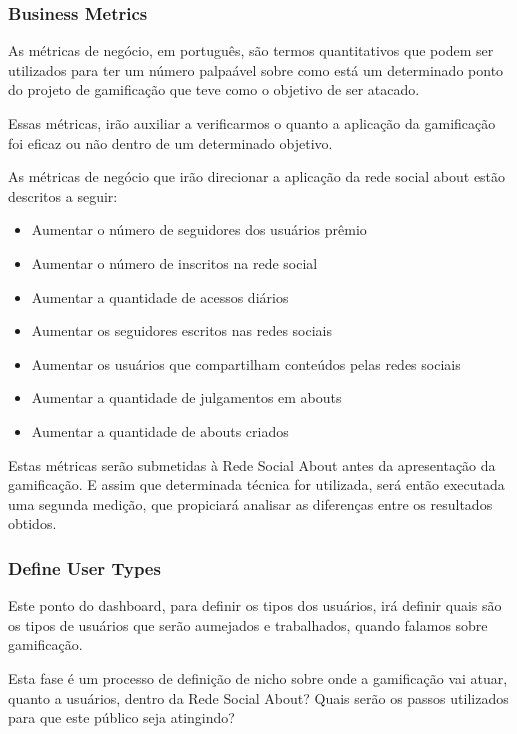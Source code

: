 \subsubsection{Business Metrics}
\label{sub:business_metrics}
As métricas de negócio, em português, são termos quantitativos que podem ser utilizados
para ter um número palpaável sobre como está um determinado ponto do projeto de gamificação
que teve como o objetivo de ser atacado.

Essas métricas, irão auxiliar a verificarmos o quanto a aplicação da gamificação foi 
eficaz ou não dentro de um determinado objetivo.

As métricas de negócio que irão direcionar a aplicação da rede social about estão
descritos a seguir:

\begin{itemize}
    \item Aumentar o número de seguidores dos usuários prêmio
    \item Aumentar o número de inscritos na rede social
    \item Aumentar a quantidade de acessos diários
    \item Aumentar os seguidores escritos nas redes sociais
    \item Aumentar os usuários que compartilham conteúdos pelas redes sociais
    \item Aumentar a quantidade de julgamentos em abouts
    \item Aumentar a quantidade de abouts criados
\end{itemize}

Estas métricas serão submetidas à Rede Social About antes da apresentação da
gamificação. E assim que determinada técnica for utilizada, será então executada uma
segunda medição, que propiciará analisar as diferenças entre os resultados obtidos.

\subsubsection{Define User Types}
\label{sub:define_user_types}
Este ponto do dashboard, para definir os tipos dos usuários, irá
definir quais são os tipos de usuários que serão aumejados e trabalhados, quando
falamos sobre gamificação.

Esta fase é um processo de definição de nicho sobre onde a gamificação vai atuar, quanto a
usuários, dentro da Rede Social About? Quais serão os passos utilizados para que este público
seja atingindo?

